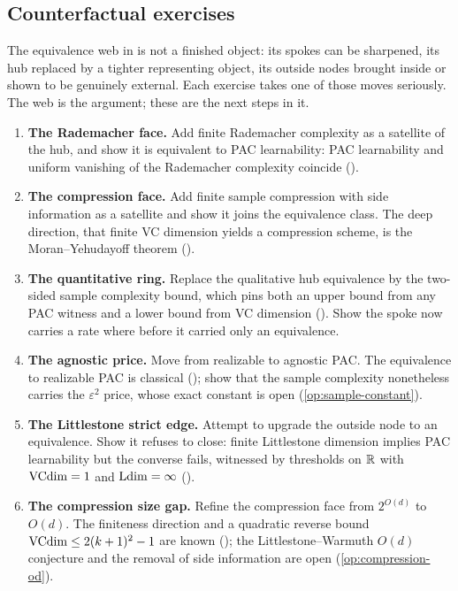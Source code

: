 \subsection*{Counterfactual exercises}

The equivalence web in  is not a finished object: its spokes can be sharpened,
its hub replaced by a tighter representing object, its outside nodes brought inside or shown to be
genuinely external.  Each exercise takes one of those moves seriously.  The web is the argument; these
are the next steps in it.

\begin{enumerate}[leftmargin=*,itemsep=3pt]
\item \textbf{The Rademacher face.} Add finite Rademacher complexity as a satellite of the hub, and show it is equivalent to PAC learnability: PAC learnability and uniform vanishing of the Rademacher complexity coincide ().

\item \textbf{The compression face.} Add finite sample compression with side information as a satellite and show it joins the equivalence class. The deep direction, that finite VC dimension yields a compression scheme, is the Moran--Yehudayoff theorem ().

\item \textbf{The quantitative ring.} Replace the qualitative hub equivalence by the two-sided sample complexity bound, which pins both an upper bound from any PAC witness and a lower bound from VC dimension (). Show the spoke now carries a rate where before it carried only an equivalence.

\item \textbf{The agnostic price.} Move from realizable to agnostic PAC. The equivalence to realizable PAC is classical (\cite{ShalevShwartzBenDavid2014}); show that the sample complexity nonetheless carries the $\varepsilon^{2}$ price, whose exact constant is open (\cref{op:sample-constant}).

\item \textbf{The Littlestone strict edge.} Attempt to upgrade the outside node to an equivalence. Show it refuses to close: finite Littlestone dimension implies PAC learnability but the converse fails, witnessed by thresholds on $\mathbb{R}$ with $\mathrm{VCdim}=1$ and $\mathrm{Ldim}=\infty$ ().

\item \textbf{The compression size gap.} Refine the compression face from $2^{O(d)}$ to $O(d)$. The finiteness direction and a quadratic reverse bound $\mathrm{VCdim} \le 2(k+1)^{2}-1$ are known (); the Littlestone--Warmuth $O(d)$ conjecture and the removal of side information are open (\cref{op:compression-od}).


\end{enumerate}
